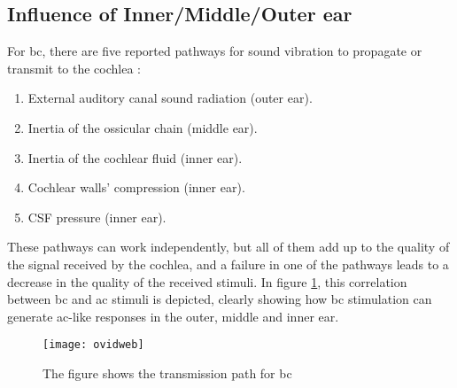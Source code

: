 \subsection{Influence of Inner/Middle/Outer ear}
For \gls{bc}, there are five reported pathways for sound vibration to propagate or transmit to the cochlea \citep{zhang_2016}:
\begin{enumerate}
\item External auditory canal sound radiation (outer ear).
\item Inertia of the ossicular chain (middle ear).
\item Inertia of the cochlear fluid (inner ear).
\item Cochlear walls' compression (inner ear).
\item CSF pressure (inner ear).
\end{enumerate}
These pathways can work independently, but all of them add up to the quality of the signal received by the cochlea, and a failure in one of the pathways leads to a decrease in the quality of the received stimuli. In figure \ref{fig:hearing_system_pathway}, this correlation between \gls{bc} and \gls{ac} stimuli is depicted, clearly showing how \gls{bc} stimulation can generate \gls{ac}-like responses in the outer, middle and inner ear.

 \begin{figure}[H]
	\centering
		\texttt{[image: ovidweb]}
		\caption{The figure shows the transmission path for \gls{bc} \citep{stenfelt_2005}}
		\label{fig:hearing_system_pathway}
\end{figure}


